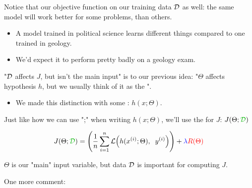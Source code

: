         Notice that our objective function  on our training data ${\cal D}$ as well: the same model will work better for some problems, than others.
    
        \begin{itemize}
            \item \miniex A model trained in political science learns different things compared to one trained in geology.
            \item We'd expect it to perform pretty badly on a geology exam.
        \end{itemize}
    
        "${\cal D}$ affects $J$, but isn't the main input" is  to our previous idea: "$\Theta$ affects hypothesis $h$, but we usually  think of it as the ".
        
        \begin{itemize}
            \item We made this distinction with some : $h(x;\Theta)$.\\
        \end{itemize}
    
        \begin{notation}
            Just like how we can use ";" when writing $h(x;\Theta)$, we'll use the  for $J$: $J(\Theta;\grn{\data})$
    
            \begin{equation*}
                    J(\Theta; \grn{\data}) =
                    \left( 
                    \frac{1}{n}  \sum_{i=1}^n \loss \Big( h(\ex{x}{i}; \Theta), \;\; \ex{y}{i} \Big) 
                    \right)
                    +
                    \blu{\lambda} \red{ R(\Theta)}
                \end{equation*}
    
            $\Theta$ is our "main" input variable, but data ${\cal D}$ is important for computing $J$.
        \end{notation}

        One more comment:\\

